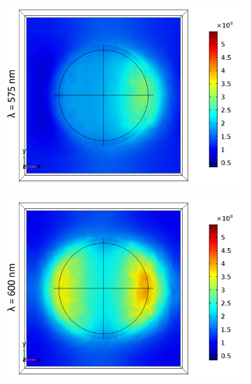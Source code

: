 \begin{figure}[htb!]
   \begin{subfigure}{0.32\textwidth}    %
        \centering
        \includegraphics[width=\linewidth]{figures/ch4/S5A/FieldDistribution/LSPR/Sample5A_TM_Slice@z=-05t_wl=575_notitle.png}
   \end{subfigure}
      \begin{subfigure}{0.32\textwidth}
        \centering
        \includegraphics[width=\linewidth]{figures/ch4/S5A/FieldDistribution/LSPR/Sample5A_TM_Slice@z=-05t_wl=600_notitle.png}
   \end{subfigure}
    \begin{subfigure}{0.32\textwidth}
        \centering

\end{subfigure}
\end{figure}
